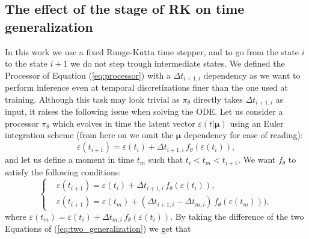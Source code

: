 \subsection{The effect of the stage of RK on time generalization}
\label{subsubsec:RK_time_gen}
In this work we use a fixed Runge-Kutta time stepper, and to go from the state $i$ to the state $i+1$ we do not step trough intermediate states. We defined the Processor of Equation (\ref{eq:processor}) with a $\Delta t_{i+1,i}$ dependency as we want to perform inference even at temporal discretizations finer than the one used at training. %
Although this task may look trivial as $\pi_\theta$ directly takes $\Delta t_{i+1,i} $ as input, it raises the following issue when solving the ODE. Let us consider a processor $\pi_\theta$ which evolves in time the latent vector $\varepsilon(t|\pmb{\mu})$ using an Euler integration scheme (from here on we omit the $\pmb{\mu}$ dependency for ease of reading):
\begin{equation}
    \varepsilon(t_{i+1})  = \varepsilon(t_{i})+\Delta t_{i+1,i}\,f_\theta(\varepsilon(t_{i})),
\end{equation}
and let us define a moment in time $t_m$ such that $t_i<t_m<t_{i+1}$. We want $f_\theta$ to satisfy the following conditions:
\begin{equation}
    \left\{
    \begin{aligned}
    &\varepsilon(t_{i+1})  = \varepsilon(t_{i})+\Delta t_{i+1,i}\,f_\theta(\varepsilon(t_{i})), \\
    &\varepsilon(t_{i+1})  = \varepsilon(t_{m}) + (\Delta t_{i+1,i}-\Delta t_{m,i})\, f_\theta(\varepsilon(t_{m}))),
    \end{aligned}
    \right.
\label{eq:two_generalization}
\end{equation}
where $\varepsilon(t_{m}) = \varepsilon(t_{i})+\Delta t_{m,i}\,f_\theta(\varepsilon(t_{i}))$.
By taking the difference of the two Equations of (\ref{eq:two_generalization}) we get that 

